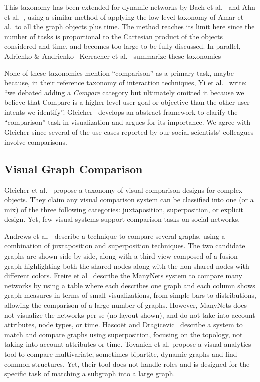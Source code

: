 This taxonomy has been extended for dynamic networks by Bach et al.~\cite{bach:hal-00906597} and Ahn et al.~\cite{Ahn14}, using a similar method of applying the low-level taxonomy of Amar et al.\ to all the graph objects plus time. The method reaches its limit here since the number of tasks is proportional to the Cartesian product of the objects considered and time, and becomes too large to be fully discussed.
In parallel, Adrienko \& Andrienko~\cite{andrienko2006exploratory}
Kerracher et al.~\cite{Kerracher15} summarize these taxonomies 

None of these taxonomies mention ``comparison'' as a primary task, maybe because, in their reference taxonomy of interaction techniques, Yi et al.~\cite{yiDeeperUnderstandingRole2007} write: ``we debated adding a \emph{Compare} category but ultimately
omitted it because we believe that Compare is a higher-level user goal or objective than the other user intents we identify''. Gleicher~\cite{Gleicher18, gleicherVisualComparisonInformation2011} develops an abstract framework to clarify the ``comparison'' task in visualization and argues for its importance.
We agree with Gleicher since several of the use cases reported by our social scientists' colleagues involve comparisons.
\fi

\subsection{Visual Graph Comparison}

Gleicher et al.~\cite{Gleicher18} propose a taxonomy of visual comparison designs for complex objects. They claim any visual comparison system can be classified into one (or a mix) of the three following categories: juxtaposition, superposition, or explicit design.
Yet, few visual systems support comparison tasks on social networks.

Andrews et al.~\cite{andrewsVisualGraphComparison2009} describe a technique to compare several graphs, using a combination of juxtaposition and superposition techniques. The two candidate graphs are shown side by side, along with a third view composed of a fusion graph highlighting both the shared nodes along with the non-shared nodes with different colors.
%
Freire et al~\cite{ManyNets} describe the ManyNets system to compare many networks by using a table where each describes one graph and each column shows graph measures in terms of small visualizations, from simple bars to distributions, allowing the comparison of a large number of graphs. However, ManyNets does not visualize the networks per se (no layout shown), and do not take into account attributes, node types, or time.
%
Hascoët and Dragicevic~\cite{HascoetD12} describe a system to match and compare graphs using superposition, focusing on the topology, not taking into account attributes or time.
Tovanich et al.\cite{tovanichVAST2020Contest2021} propose a visual analytics tool to compare multivariate, sometimes bipartite, dynamic graphs and find common structures. Yet, their tool does not handle roles and is designed for the specific task of matching a subgraph into a large graph.

